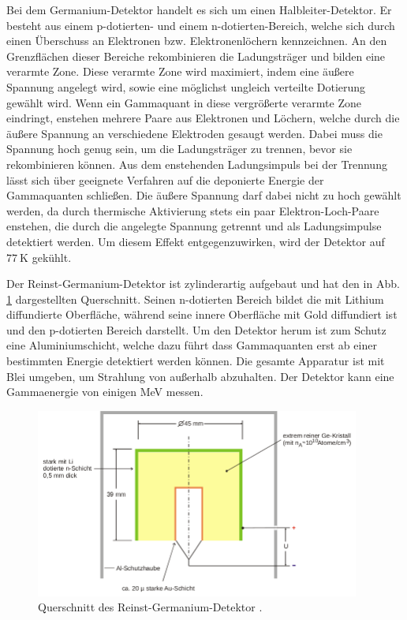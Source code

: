    Bei dem Germanium-Detektor handelt es sich um einen Halbleiter-Detektor.
    Er besteht aus einem p-dotierten- und einem n-dotierten-Bereich, welche
    sich durch einen Überschuss an Elektronen bzw. Elektronenlöchern kennzeichnen.
    An den Grenzflächen dieser Bereiche rekombinieren die Ladungsträger und bilden eine
    verarmte Zone. Diese verarmte Zone wird maximiert, indem eine äußere Spannung angelegt wird, sowie
    eine möglichst ungleich verteilte Dotierung gewählt wird. Wenn ein Gammaquant in diese
    vergrößerte verarmte Zone eindringt, enstehen mehrere
    Paare aus Elektronen und Löchern, welche durch die äußere Spannung an verschiedene
    Elektroden gesaugt werden. Dabei muss die Spannung hoch genug sein, um die Ladungsträger zu trennen,
    bevor sie rekombinieren können. Aus dem enstehenden Ladungsimpuls bei der Trennung lässt sich
    über geeignete Verfahren auf die deponierte Energie der Gammaquanten schließen.
    Die äußere Spannung darf dabei nicht zu hoch gewählt werden, da durch
    thermische Aktivierung stets ein paar Elektron-Loch-Paare enstehen, die durch die angelegte
    Spannung getrennt und als Ladungsimpulse detektiert werden. Um diesem Effekt entgegenzuwirken, wird der
    Detektor auf $\SI{77}{\kelvin}$ gekühlt.

    Der Reinst-Germanium-Detektor ist zylinderartig aufgebaut und hat den in Abb. \ref{fig:detektor}
    dargestellten Querschnitt. Seinen n-dotierten Bereich bildet die mit Lithium diffundierte Oberfläche,
    während seine innere Oberfläche mit Gold diffundiert ist und den p-dotierten Bereich darstellt.
    Um den Detektor herum ist zum Schutz eine Aluminiumschicht, welche dazu führt dass Gammaquanten erst ab einer
    bestimmten Energie detektiert werden können.
    Die gesamte Apparatur ist mit Blei umgeben, um Strahlung von außerhalb abzuhalten.
    Der Detektor kann eine Gammaenergie von einigen MeV messen.
    \begin{figure}
      \centering
      \includegraphics[width=0.95\textwidth]{detektor.png}
      \caption{Querschnitt des Reinst-Germanium-Detektor \cite{anleitungv18}.}
      \label{fig:detektor}
    \end{figure}

